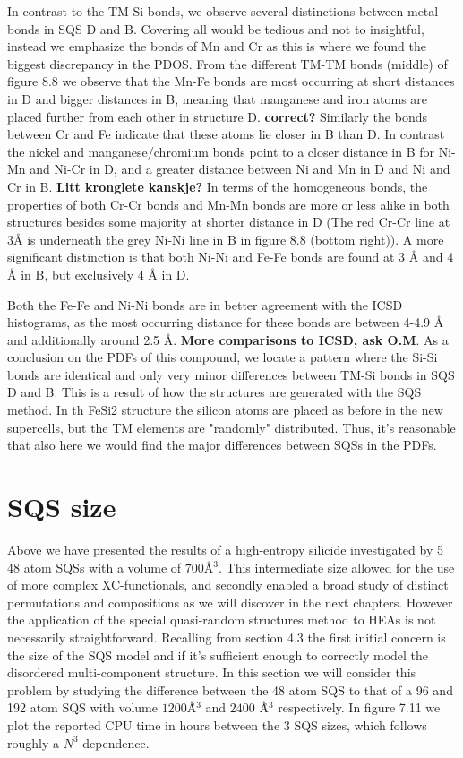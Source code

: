 In contrast to the TM-Si bonds, we observe several distinctions between metal bonds in SQS D and B. Covering all would be tedious and not to insightful, instead we emphasize the bonds of Mn and Cr as this is where we found the biggest discrepancy in the PDOS. From the different TM-TM bonds (middle) of figure 8.8 we observe that the Mn-Fe bonds are most occurring at short distances in D and bigger distances in B, meaning that manganese and iron atoms are placed further from each other in structure D. \textbf{correct?} Similarly the bonds between Cr and Fe   indicate that these atoms lie closer in B than D. In contrast the nickel and manganese/chromium bonds point to a closer distance in B for Ni-Mn and Ni-Cr in D, and a greater distance between Ni and Mn in D and Ni and Cr in B. \textbf{Litt kronglete kanskje?} In terms of the homogeneous bonds, the properties of both Cr-Cr bonds and Mn-Mn bonds are more or less alike in both structures besides some majority at shorter distance in D (The red Cr-Cr line at 3Å is underneath the grey Ni-Ni line in B in figure 8.8 (bottom right)). A more significant distinction is that both Ni-Ni and Fe-Fe bonds are found at 3 Å and 4 Å in B, but exclusively 4 Å in D.    

Both the Fe-Fe and Ni-Ni bonds are in better agreement with the ICSD histograms, as the most occurring distance for these bonds are between 4-4.9 Å and additionally around 2.5 Å. \textbf{More comparisons to ICSD, ask O.M}. As a conclusion on the PDFs of this compound, we locate a pattern where the Si-Si bonds are identical and only very minor differences between TM-Si bonds in SQS D and B. This is a result of how the structures are generated with the SQS method. In th FeSi2 structure the silicon atoms are placed as before in the new supercells, but the TM elements are "randomly" distributed. Thus, it's reasonable that also here we would find the major differences between SQSs in the PDFs. 

\newpage
\section{SQS size}
Above we have presented the results of a high-entropy silicide  investigated by 5 48 atom SQSs with a volume of $700$\r{A}$^3$. This intermediate size allowed for the use of more complex XC-functionals, and secondly enabled a broad study of distinct permutations and compositions as we will discover in the next chapters. However the application of the special quasi-random structures method to HEAs is not necessarily straightforward. Recalling from section 4.3 the first initial concern is the size of the SQS model and if it's sufficient enough to correctly model the disordered multi-component structure. In this section we will consider this problem by studying the difference between the 48 atom SQS to that of a 96 and 192 atom SQS with volume $1200$\r{Å}$^3$ and $2400$ \r{Å}$^3$ respectively. In figure 7.11 we plot the reported CPU time in hours between the 3 SQS sizes, which follows roughly a $N^3$ dependence. 

